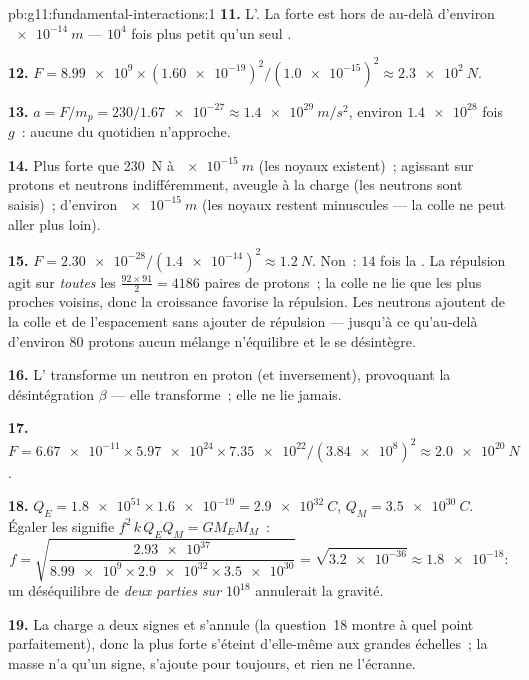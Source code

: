 \begin{solution}{pb:g11:fundamental-interactions:1}
\textbf{11.} L'. La  forte est hors de
 au-delà d'environ
$\qty{e-14}{m}$ --- $10^{4}$ fois plus petit qu'un seul
.

\textbf{12.} $F = \num{8.99e9} \times (\num{1.60e-19})^2 /
(\num{1.0e-15})^2 \approx \qty{2.3e2}{N}$.

\textbf{13.} $a = F/m_p = 230/\num{1.67e-27} \approx
\qty{1.4e29}{m/s^2}$, environ $\num{1.4e28}$ fois $g$~: aucune
 du quotidien n'approche.

\textbf{14.} Plus forte que \qty{230}{N} à $\qty{e-15}{m}$ (les noyaux
existent)~; agissant sur protons et neutrons indifféremment, aveugle à
la charge (les neutrons sont saisis)~;
 d'environ $\qty{e-15}{m}$ (les
noyaux restent minuscules --- la colle ne peut aller plus loin).

\textbf{15.} $F = \num{2.30e-28}/(\num{1.4e-14})^2 \approx
\qty{1.2}{N}$. Non~: $14$ fois la
. La répulsion agit sur
\emph{toutes} les $\frac{92\times91}{2} = 4186$ paires de protons~; la
colle ne lie que les plus proches voisins, donc la croissance favorise
la répulsion. Les neutrons ajoutent de la colle et de l'espacement sans
ajouter de répulsion --- jusqu'à ce qu'au-delà d'environ $80$ protons
aucun mélange n'équilibre et le
 se désintègre.

\textbf{16.} L' transforme
un neutron en proton (et inversement), provoquant la désintégration
$\beta$ --- elle transforme~; elle ne lie jamais.

\textbf{17.} $F = \num{6.67e-11} \times \num{5.97e24} \times
\num{7.35e22}/(\num{3.84e8})^2 \approx \qty{2.0e20}{N}$.

\textbf{18.} $Q_E = \num{1.8e51} \times \num{1.6e-19} =
\qty{2.9e32}{C}$, $Q_M = \qty{3.5e30}{C}$. Égaler les
 signifie
$f^2\,k\,Q_E Q_M = G M_E M_M$~:
\[
f = \sqrt{\frac{\num{2.93e37}}{\num{8.99e9} \times \num{2.9e32}
\times \num{3.5e30}}} = \sqrt{\num{3.2e-36}} \approx \num{1.8e-18} :
\]
un déséquilibre de \emph{deux parties sur $10^{18}$} annulerait la
gravité.

\textbf{19.} La charge a deux signes et s'annule (la question~18 montre
à quel point parfaitement), donc la 
plus forte s'éteint d'elle-même aux grandes échelles~; la masse n'a
qu'un signe, s'ajoute pour toujours, et rien ne l'écranne.


\end{solution}
